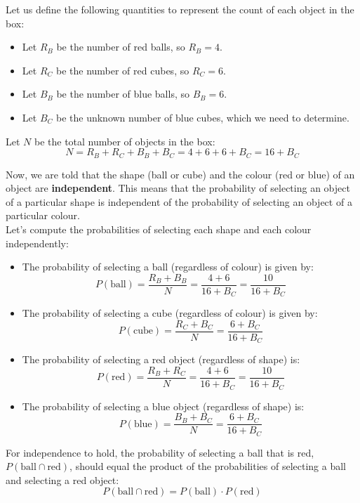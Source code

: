 \begin{solution}

    Let us define the following quantities to represent the count of each object in the box:
\begin{itemize}
    \item Let $R_B$ be the number of red balls, so $R_B = 4$.
    \item Let $R_C$ be the number of red cubes, so $R_C = 6$.
    \item Let $B_B$ be the number of blue balls, so $B_B = 6$.
    \item Let $B_C$ be the unknown number of blue cubes, which we need to determine.
\end{itemize}

Let $N$ be the total number of objects in the box:
\[
N = R_B + R_C + B_B + B_C = 4 + 6 + 6 + B_C = 16 + B_C
\]

Now, we are told that the shape (ball or cube) and the colour (red or blue) of an object are \textbf{independent}. This means that the probability of selecting an object of a particular shape is independent of the probability of selecting an object of a particular colour.\\

Let's compute the probabilities of selecting each shape and each colour independently:
\begin{itemize}
    \item The probability of selecting a ball (regardless of colour) is given by:
    \[
    P(\text{ball}) = \frac{R_B + B_B}{N} = \frac{4 + 6}{16 + B_C} = \frac{10}{16 + B_C}
    \]
    
    \item The probability of selecting a cube (regardless of colour) is given by:
    \[
    P(\text{cube}) = \frac{R_C + B_C}{N} = \frac{6 + B_C}{16 + B_C}
    \]
    
    \item The probability of selecting a red object (regardless of shape) is:
    \[
    P(\text{red}) = \frac{R_B + R_C}{N} = \frac{4 + 6}{16 + B_C} = \frac{10}{16 + B_C}
    \]
    
    \item The probability of selecting a blue object (regardless of shape) is:
    \[
    P(\text{blue}) = \frac{B_B + B_C}{N} = \frac{6 + B_C}{16 + B_C}
    \]
\end{itemize}

For independence to hold, the probability of selecting a ball that is red, $P(\text{ball} \cap \text{red})$, should equal the product of the probabilities of selecting a ball and selecting a red object:
\[
P(\text{ball} \cap \text{red}) = P(\text{ball}) \cdot P(\text{red})
\]


\end{solution}
